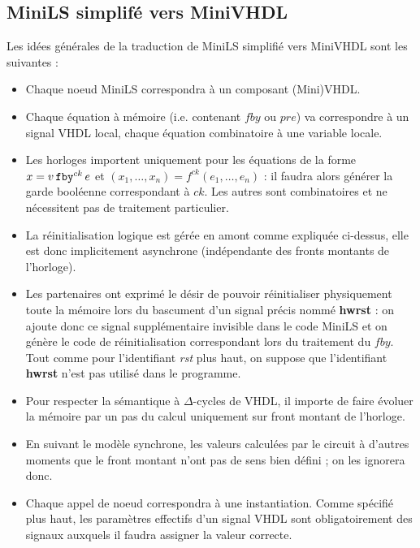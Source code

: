 \documentclass[a4paper]{article}
\newcommand{\mybox}[1]{\mbox{\tt{#1}}}
\newcommand{\Fby}[2]{#1 \, \mybox{fby}^{ck} \, #2}
\newcommand{\App}[2]{#1^{ck}(#2)}
\begin{document}
\subsection{MiniLS simplif\'e vers MiniVHDL}

Les id\'ees g\'en\'erales de la traduction de MiniLS simplifi\'e vers MiniVHDL sont les
suivantes :

\begin{itemize}
\item Chaque noeud MiniLS correspondra \`a un composant (Mini)VHDL.
\item Chaque \'equation \`a m\'emoire (i.e. contenant $fby$ ou $pre$) va correspondre
  \`a un signal VHDL local, chaque \'equation combinatoire \`a une variable locale.
\item Les horloges importent uniquement pour les équations de la forme $x =
  \Fby{v}{e}$ et $(x_1,\dots,x_n) = \App{f}{e_1,\dots,e_n}$ : il faudra alors
  générer la garde booléenne correspondant à $ck$. Les autres sont combinatoires
  et ne nécessitent pas de traitement particulier.
\item La r\'einitialisation logique est g\'er\'ee en amont comme expliqu\'ee ci-dessus,
  elle est donc implicitement asynchrone (ind\'ependante des fronts montants de
  l'horloge).
\item Les partenaires ont exprim\'e le d\'esir de pouvoir r\'einitialiser
  physiquement toute la m\'emoire lors du bascument d'un signal pr\'ecis nomm\'e
  \textbf{hwrst} : on ajoute donc ce signal suppl\'ementaire invisible dans le
  code MiniLS et on g\'en\`ere le code de r\'einitialisation correspondant lors
  du traitement du $fby$. Tout comme pour l'identifiant \textit{rst} plus haut, on suppose que l'identifiant \textbf{hwrst} n'est pas utilisé dans le programme.
\item Pour respecter la s\'emantique \`a $\Delta$-cycles de VHDL, il importe de
  faire \'evoluer la m\'emoire par un pas du calcul uniquement sur front montant de
  l'horloge.
\item En suivant le mod\`ele synchrone, les valeurs calcul\'ees par le circuit \`a
  d'autres moments que le front montant n'ont pas de sens bien d\'efini ; on les
  ignorera donc.
\item Chaque appel de noeud correspondra \`a une instantiation. Comme sp\'ecifi\'e
  plus haut, les param\`etres effectifs d'un signal VHDL sont obligatoirement des
  signaux auxquels il faudra assigner la valeur correcte.
\end{itemize}
\end{document}
